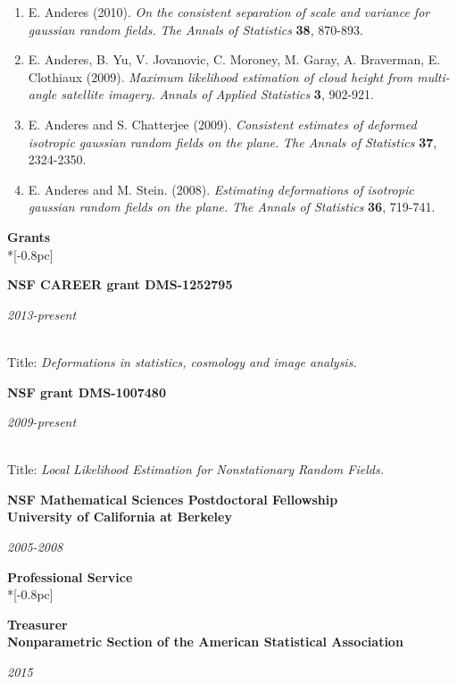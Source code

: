 \documentclass[11pt]{article}
\newcommand{\head}[1]{
  \vspace{10pt}
  {\Large \bf #1} \\*[-0.8pc]
  \underline{\hspace{6.07in}}}
\newcommand{\datedentry}[2]{
  \vspace{5pt}
  \begin{minipage}{5in}{\textbf{#1}}\end{minipage}
  \hfill
  \begin{minipage}{1in}{\hfill\textit{#2}}\end{minipage}
  }
\begin{document}
\begin{enumerate}[labelindent=0pt]
\item
E. Anderes (2010).  \textsl{On the consistent separation of scale and variance for gaussian random fields.} \textit{The Annals of Statistics} {\bf 38}, 870-893.



\item
E. Anderes, B. Yu, V. Jovanovic, C. Moroney, M. Garay, A. Braverman, E. Clothiaux (2009).
\textsl{Maximum likelihood estimation of cloud height from multi-angle satellite imagery.}   \textit{Annals of Applied Statistics} {\bf 3}, 902-921.


\item
E. Anderes and S. Chatterjee (2009). \textsl{Consistent estimates of deformed isotropic gaussian random fields on the plane.} \textit{The Annals of Statistics} {\bf 37}, 2324-2350.



\item
E. Anderes and M. Stein. (2008). \textsl{Estimating deformations of isotropic gaussian random fields on the plane.} \textit{The Annals of Statistics} {\bf 36}, 719-741.


 \end{enumerate}


%
%

\head{Grants}%
 \vspace{.1mm}


\datedentry{NSF CAREER grant DMS-1252795}{2013-present}\\
Title: {\sl Deformations in statistics, cosmology and image analysis.}

\vspace{7pt}

\datedentry{NSF grant DMS-1007480 }{2009-present}\\
Title: {\sl Local Likelihood Estimation for Nonstationary Random Fields.}

\vspace{9pt}

\datedentry{NSF Mathematical Sciences Postdoctoral Fellowship\\
University of California at Berkeley}{2005-2008}


\head{Professional Service}


\datedentry{Treasurer\\ Nonparametric Section of the American Statistical Association}{2015}
\end{document}
